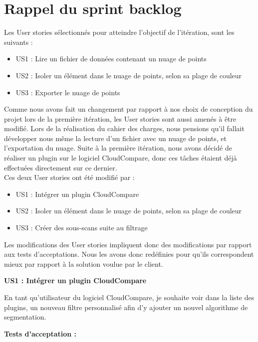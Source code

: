 \documentclass[12pt,titlepage,french]{article}
\begin{document}
\section{Rappel du sprint backlog}

Les User stories sélectionnés pour atteindre l'objectif de l'itération, sont les suivants :

\begin{itemize}
  \item US1 : Lire un fichier de données contenant un nuage de points
  \item US2 : Isoler un élément dans le nuage de points, selon sa plage de couleur
  \item US3 : Exporter le nuage de points
\end{itemize}

Comme nous avons fait un changement par rapport à nos choix de conception du projet lors de la première itération, les User stories sont aussi amenés à être modifié. Lors de la réalisation du cahier des charges, nous pensions qu'il fallait développer nous même la lecture d'un fichier avec un nuage de points, et l'exportation du nuage. Suite à la première itération, nous avons décidé de réaliser un plugin sur le logiciel CloudCompare, donc ces tâches étaient déjà effectuées directement sur ce dernier. \\
Ces deux User stories ont été modifié par : 
\begin{itemize}
  \item US1 : Intégrer un plugin CloudCompare
  \item US2 : Isoler un élément dans le nuage de points, selon sa plage de couleur
  \item US3 : Créer des sous-scans suite au filtrage\\
\end{itemize}

Les modifications des User stories impliquent donc des modifications par rapport aux tests d'acceptations. Nous les avons donc redéfinies pour qu'ils correspondent mieux par rapport à la solution voulue par le client.

\textbf{\og US1 : Intégrer un plugin CloudCompare\fg{}}

En tant qu'utilisateur du logiciel CloudCompare, je souhaite voir dans la liste des plugins, un nouveau filtre personnalisé afin d'y ajouter un nouvel algorithme de segmentation.

\textbf{Tests d'acceptation :}
\end{document}
